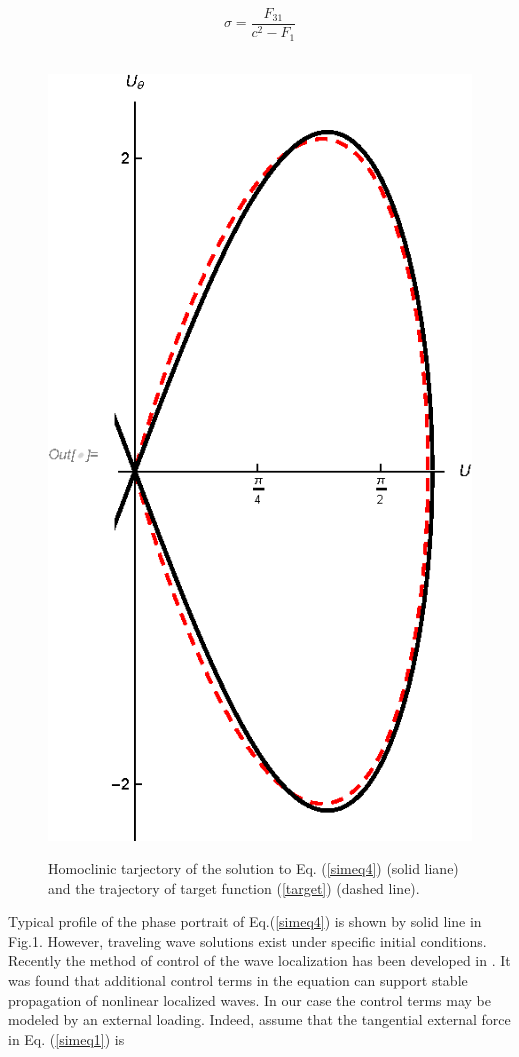 \[
\sigma=\frac{F_{31}}{c^2-F_1}
\]
\begin{figure}
	\begin{center}
		\
		\includegraphics[scale=0.8]{images/boundary_fig1.eps}
		\caption{Homoclinic tarjectory of the solution to Eq. (\ref{simeq4}) (solid liane) and the trajectory of target function (\ref{target}) (dashed line).}
	\end{center}
\end{figure}
Typical profile of the phase portrait of Eq.(\ref{simeq4}) is shown by solid line in Fig.1. However, traveling wave solutions exist under specific initial conditions. Recently the method of control of the wave localization has been developed in \cite{fradkov, porant16,  porandr17}. It was found that additional control terms in the equation can support stable propagation of nonlinear localized waves. In our case the control terms may be modeled by an external loading. Indeed,  assume that  the tangential external force in Eq. (\ref{simeq1}) is
